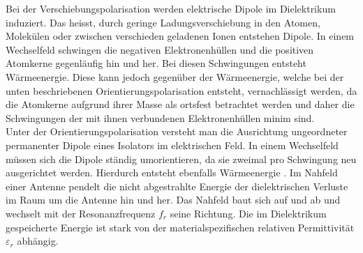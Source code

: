 Bei der Verschiebungspolarisation werden elektrische Dipole im Dielektrikum induziert. Das heisst, durch geringe Ladungsverschiebung in den Atomen, Molekülen oder zwischen verschieden geladenen Ionen entstehen Dipole. In einem Wechselfeld schwingen die negativen Elektronenhüllen und die positiven Atomkerne gegenläufig hin und her. Bei diesen Schwingungen entsteht Wärmeenergie. Diese kann jedoch gegenüber der Wärmeenergie, welche bei der unten beschriebenen Orientierungspolarisation entsteht, vernachlässigt werden, da  die Atomkerne aufgrund ihrer Masse als ortsfest betrachtet werden und daher die Schwingungen der mit ihnen verbundenen Elektronenhüllen minim sind.\\
Unter der Orientierungspolarisation versteht man die Ausrichtung ungeordneter permanenter Dipole eines Isolators im elektrischen Feld. In einem Wechselfeld müssen sich die Dipole ständig umorientieren, da sie zweimal pro Schwingung neu ausgerichtet werden. Hierdurch entsteht ebenfalls Wärmeenergie \cite{DielektrikumPolarisation}. Im Nahfeld einer Antenne pendelt die nicht abgestrahlte Energie der dielektrischen Verluste im Raum um die Antenne hin und her. Das Nahfeld baut sich auf und ab und wechselt mit der Resonanzfrequenz $f_{r}$ seine Richtung. Die im Dielektrikum gespeicherte Energie ist stark von der materialspezifischen relativen Permittivität $\varepsilon_r $ abhängig.\\

